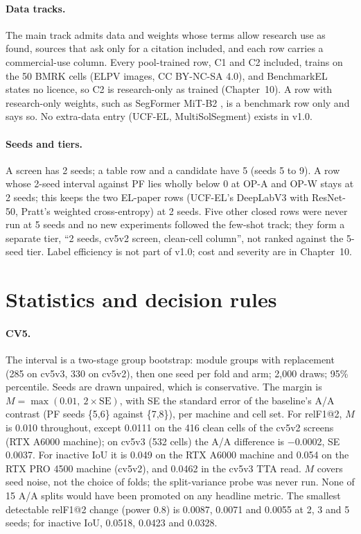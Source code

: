 \paragraph{Data tracks.} The main track admits data and weights whose terms allow research use as found, sources that ask only for a
citation included, and each row carries a commercial-use column. Every pool-trained row, C1 and C2 included, trains on the 50 BMRK
cells (ELPV images, CC BY-NC-SA 4.0), and BenchmarkEL states no licence, so C2 is research-only as trained (Chapter~10). A row with
research-only weights, such as SegFormer MiT-B2 \citep{xie2021segformer}, is a benchmark row only and says so. No extra-data entry
(UCF-EL, MultiSolSegment) exists in v1.0.

\paragraph{Seeds and tiers.} A screen has 2 seeds; a table row and a candidate have 5 (seeds 5 to 9). A row whose 2-seed interval
against PF lies wholly below 0 at OP-A and OP-W stays at 2 seeds; this keeps the two EL-paper rows (UCF-EL's DeepLabV3 with
ResNet-50, Pratt's weighted cross-entropy) at 2 seeds. Five other closed rows were never run at 5 seeds and no new experiments
followed the few-shot track; they form a separate tier, ``2 seeds, cv5v2 screen, clean-cell column'', not ranked against the 5-seed
tier. Label efficiency is not part of v1.0; cost and severity are in Chapter~10.

\section{Statistics and decision rules}
\label{sec:protocol-stats}

\paragraph{CV5.} The interval is a two-stage group bootstrap: module groups with replacement (285 on cv5v3, 330 on cv5v2), then one
seed per fold and arm; 2,000 draws; 95\% percentile. Seeds are drawn unpaired, which is conservative. The margin is
$M=\max(0.01,\ 2\times\mathrm{SE})$, with SE the standard error of the baseline's A/A contrast (PF seeds \{5,6\} against \{7,8\}), per
machine and cell set. For relF1@2, $M$ is 0.010 throughout, except 0.0111 on the 416 clean cells of the cv5v2 screens (RTX A6000 machine); on cv5v3 (532 cells) the A/A difference is $-$0.0002, SE 0.0037. For
inactive IoU it is 0.049 on the RTX A6000 machine and 0.054 on the RTX PRO 4500 machine (cv5v2), and 0.0462 in the cv5v3 TTA read.
$M$ covers seed noise, not the choice of folds; the split-variance probe was never run. None of 15 A/A splits would have been promoted on any headline metric.
The smallest detectable relF1@2 change (power 0.8) is 0.0087, 0.0071 and 0.0055 at 2, 3 and 5 seeds; for inactive IoU, 0.0518, 0.0423
and 0.0328.

